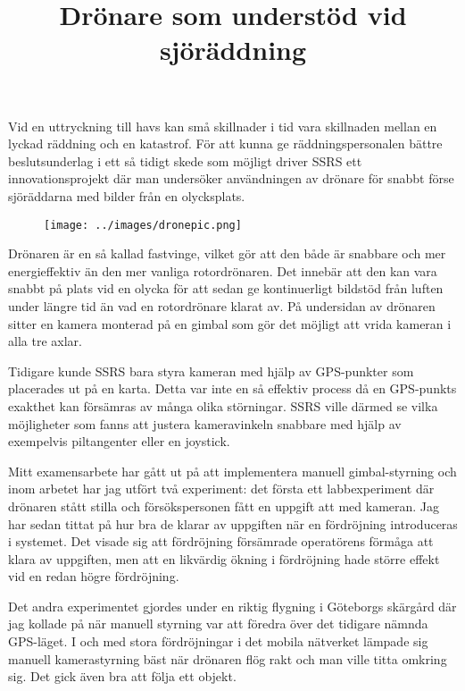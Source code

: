\documentclass{popsci}
\title{Drönare som understöd vid sjöräddning}
\begin{document}

{\noindent Vid en uttryckning till havs kan små skillnader i tid vara skillnaden mellan en lyckad räddning och en katastrof. För att kunna ge räddningspersonalen bättre beslutsunderlag i ett så tidigt skede som möjligt driver SSRS ett innovationsprojekt där man undersöker användningen av drönare för snabbt förse sjöräddarna med bilder från en olycksplats.

\begin{figure}[!bth] %
    \texttt{[image: ../images/dronepic.png]} 
\end{figure}

Drönaren är en så kallad fastvinge, vilket gör att den både är snabbare och mer energieffektiv än den mer vanliga rotordrönaren. Det innebär att den kan vara snabbt på plats vid en olycka för att sedan ge kontinuerligt bildstöd från luften under längre tid än vad en rotordrönare klarat av. På undersidan av drönaren sitter en kamera monterad på en gimbal som gör det möjligt att vrida kameran i alla tre axlar.

Tidigare kunde SSRS bara styra kameran med hjälp av GPS-punkter som placerades ut på en karta. Detta var inte en så effektiv process då en GPS-punkts exakthet kan försämras av många olika störningar. SSRS ville därmed se vilka möjligheter som fanns att justera kameravinkeln snabbare med hjälp av exempelvis piltangenter eller en joystick.

Mitt examensarbete har gått ut på att implementera manuell gimbal-styrning och inom arbetet har jag utfört två experiment: det första ett labbexperiment där drönaren stått stilla och försökspersonen fått en uppgift att med kameran. Jag har sedan tittat på hur bra de klarar av uppgiften när en fördröjning introduceras i systemet. Det visade sig att fördröjning försämrade operatörens förmåga att klara av uppgiften, men att en likvärdig ökning i fördröjning hade större effekt vid en redan högre fördröjning.

Det andra experimentet gjordes under en riktig flygning i Göteborgs skärgård där jag kollade på när manuell styrning var att föredra över det tidigare nämnda GPS-läget. I och med stora fördröjningar i det mobila nätverket lämpade sig manuell kamerastyrning bäst när drönaren flög rakt och man ville titta omkring sig. Det gick även bra att följa ett objekt. 
}
\end{document}
